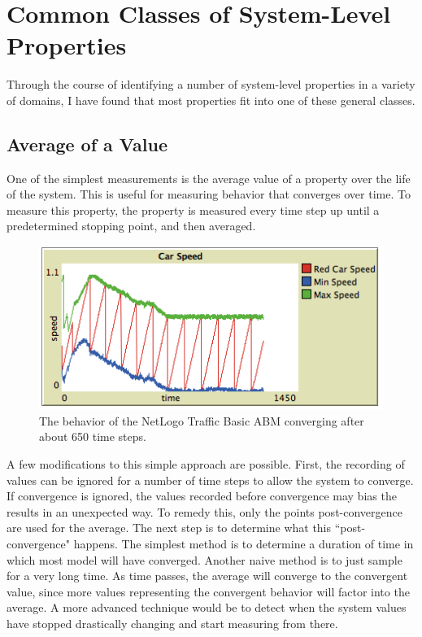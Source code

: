 \section{Common Classes of System-Level Properties}

Through the course of identifying a number of system-level properties in a variety of domains, I have found that most properties fit into one of these general classes.


\subsection{Average of a Value}
One of the simplest measurements is the average value of a property over the life of the system.
This is useful for measuring behavior that converges over time.
To measure this property, the property is measured every time step up until a predetermined stopping point, and then averaged.

\begin{figure}[ht]
\centering
\includegraphics[scale=.75]{images/traffic_converge.png}
\caption{The behavior of the NetLogo Traffic Basic ABM converging after about 650 time steps.}
\label{fig:traffic_converge}
\end{figure}


A few modifications to this simple approach are possible.
First, the recording of values can be ignored for a number of time steps to allow the system to converge.
If convergence is ignored, the values recorded before convergence may bias the results in an unexpected way.
To remedy this, only the points post-convergence are used for the average.
The next step is to determine what this ``post-convergence" happens.
The simplest method is to determine a duration of time in which most model will have converged.
Another naive method is to just sample for a very long time.
As time passes, the average will converge to the convergent value, since more values representing the convergent behavior will factor into the average.
A more advanced technique would be to detect when the system values have stopped drastically changing and start measuring from there.

